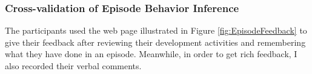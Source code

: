 \subsubsection{Cross-validation of Episode Behavior Inference}
\label{subsec:ParticipantEpisodeBehavior}
The participants used the web page illustrated in Figure
\ref{fig:EpisodeFeedback} to give their feedback after reviewing their
development activities and remembering what they have done in an
episode. Meanwhile, in order to get rich feedback, I also recorded
their verbal comments.

